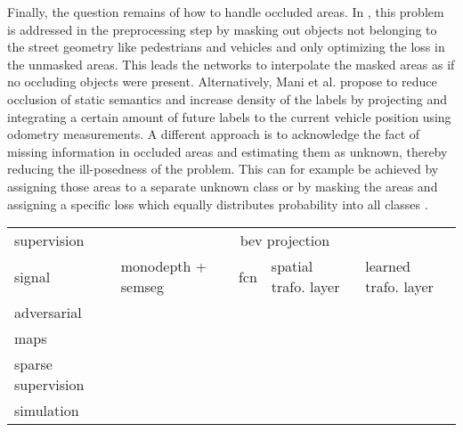 Finally, the question remains of how to handle occluded areas. In \cite{schulter2018learning}, this problem is addressed in the preprocessing step by masking out objects not belonging to the street geometry like pedestrians and vehicles and only optimizing the loss in the unmasked areas. This leads the networks to interpolate the masked areas as if no occluding objects were present. Alternatively, Mani et al. \cite{mani2020monolayout} propose to reduce occlusion of static semantics and increase density of the labels by projecting and integrating a certain amount of future labels to the current vehicle position using odometry measurements. A different approach is to acknowledge the fact of missing information in occluded areas and estimating them as unknown, thereby reducing the ill-posedness of the problem. This can for example be achieved by assigning those areas to a separate unknown class \cite{reiher2020sim2real} or by masking the areas and assigning a specific loss which equally distributes probability into all classes \cite{roddick2020predicting}. 
\begin{center}
	\begin{tabular}{m{4.0cm}|m{2.5cm}|m{2.0cm}|m{2.5cm}|m{2.5cm}}
		supervision& \multicolumn{4}{c}{\gls{bev} projection}\\
		\cline{2-5}
		signal& \gls{monodepth} + \gls{semseg} & \gls{fcn} & spatial trafo. layer & learned trafo. layer\\
		\hline
		adversarial & \cite{schulter2018learning} & \cite{mani2020monolayout} & & \\
		\hline
		maps & \cite{schulter2018learning,philion2020lift} & \cite{mani2020monolayout} & \cite{roddick2020predicting} & \\
		\hline
		sparse supervision &  & \cite{mani2020monolayout,lu2019monocular} &  &\\
		\hline
		simulation &  & \cite{reiher2020sim2real} & \cite{reiher2020sim2real} & \cite{pan2020cross}
	\end{tabular}
\end{center} 
%
